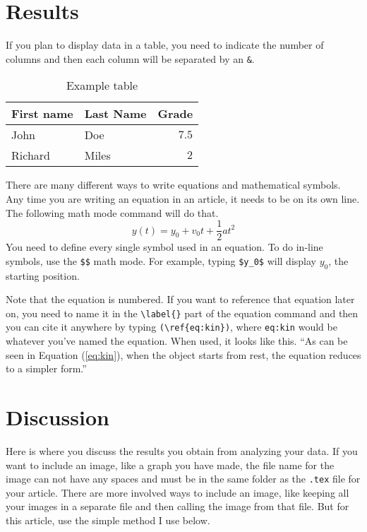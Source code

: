 \documentclass[twoside,twocolumn]{article}
\begin{document}

\section{Results}

If you plan to display data in a table, you need to indicate the number of columns and then each column will be separated by an \texttt{\&}. 

\begin{table}
\caption{Example table}
\centering
\begin{tabular}{llr}
\toprule
First name & Last Name & Grade \\
\midrule
John & Doe & $7.5$ \\
Richard & Miles & $2$ \\
\bottomrule
\end{tabular}
\end{table}

There are many different ways to write equations and mathematical symbols. Any time you are writing an equation in an article, it needs to be on its own line. The following math mode command will do that.
\begin{equation}
\label{eq:kin} %
y(t) = y_0 + v_0 t + \frac{1}{2}a t^2
\end{equation}
You need to define every single symbol used in an equation. To do in-line symbols, use the \texttt{\$\$} math mode. For example, typing \verb|$y_0$| will display $y_0$, the starting position.

Note that the equation is numbered. If you want to reference that equation later on, you need to name it in the \verb|\label{}| part of the equation command and then you can cite it anywhere by typing \verb|(\ref{eq:kin})|, where \verb|eq:kin| would be whatever you've named the equation. When used, it looks like this. ``As can be seen in Equation (\ref{eq:kin}), when the object starts from rest, the equation reduces to a simpler form.''



\section{Discussion}
Here is where you discuss the results you obtain from analyzing your data. If you want to include an image, like a graph you have made, the file name for the image can not have any spaces and must be in the same folder as the \texttt{.tex} file for your article. There are more involved ways to include an image, like keeping all your images in a separate file and then calling the image from that file. But for this article, use the simple method I use below. 
\end{document}

